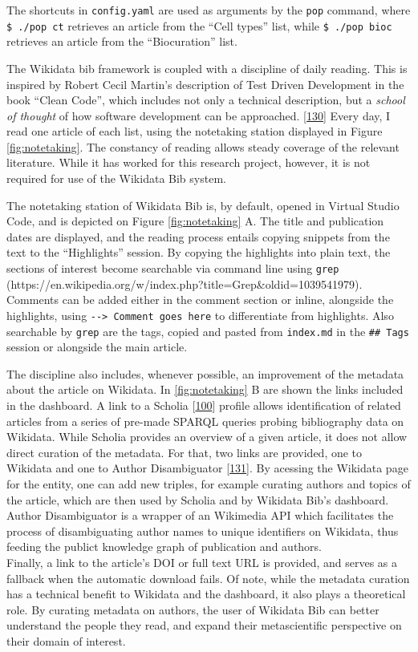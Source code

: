 The shortcuts in \texttt{config.yaml} are used as arguments by the \texttt{pop} command, where \texttt{\$\ ./pop\ ct} retrieves an article from the ``Cell types'' list, while \texttt{\$\ ./pop\ bioc} retrieves an article from the ``Biocuration'' list.

The Wikidata bib framework is coupled with a discipline of daily reading.
This is inspired by Robert Cecil Martin's description of Test Driven Development in the book ``Clean Code'', which includes not only a technical description, but a \emph{school of thought} of how software development can be approached. {[}\protect\hyperlink{ref-13HqB23xH}{130}{]}
Every day, I read one article of each list, using the notetaking station displayed in Figure \ref{fig:notetaking}.
The constancy of reading allows steady coverage of the relevant literature.
While it has worked for this research project, however, it is not required for use of the Wikidata Bib system.

The notetaking station of Wikidata Bib is, by default, opened in Virtual Studio Code, and is depicted on Figure \ref{fig:notetaking} A.
The title and publication dates are displayed, and the reading process entails copying snippets from the text to the ``Highlights'' session.
By copying the highlights into plain text, the sections of interest become searchable via command line using \texttt{grep} (https://en.wikipedia.org/w/index.php?title=Grep\&oldid=1039541979).
Comments can be added either in the comment section or inline, alongside the highlights, using \texttt{-\/-\textgreater{}\ Comment\ goes\ here} to differentiate from highlights.
Also searchable by \texttt{grep} are the tags, copied and pasted from \texttt{index.md} in the \texttt{\#\#\ Tags} session or alongside the main article.

The discipline also includes, whenever possible, an improvement of the metadata about the article on Wikidata.
In \ref{fig:notetaking} B are shown the links included in the dashboard.
A link to a Scholia {[}\protect\hyperlink{ref-hxzL9pmm}{100}{]} profile allows identification of related articles from a series of pre-made SPARQL queries probing bibliography data on Wikidata.
While Scholia provides an overview of a given article, it does not allow direct curation of the metadata.
For that, two links are provided, one to Wikidata and one to Author Disambiguator {[}\protect\hyperlink{ref-1A9RvszKC}{131}{]}.
By acessing the Wikidata page for the entity, one can add new triples, for example curating authors and topics of the article, which are then used by Scholia and by Wikidata Bib's dashboard.
Author Disambiguator is a wrapper of an Wikimedia API which facilitates the process of disambiguating author names to unique identifiers on Wikidata, thus feeding the publict knowledge graph of publication and authors.\\
Finally, a link to the article's DOI or full text URL is provided, and serves as a fallback when the automatic download fails.
Of note, while the metadata curation has a technical benefit to Wikidata and the dashboard, it also plays a theoretical role.
By curating metadata on authors, the user of Wikidata Bib can better understand the people they read, and expand their metascientific perspective on their domain of interest.

